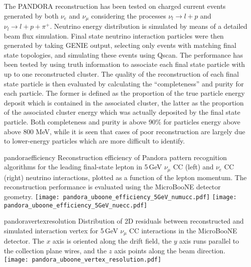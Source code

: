 The PANDORA reconstruction has been tested on charged current events generated by both   $\nu_{e}$  and $\nu_{\mu}$  
considering the processes $\nu_{l}\to l+p$  and $\nu_{l}\to l+p+\pi^{+}$.
Neutrino energy distribution is simulated by means of a detailed beam flux simulation.
Final state neutrino interaction particles were then generated by taking GENIE output, selecting only events with matching final state topologies, 
and simulating these events using Qscan.
 The performance has been tested by using truth information to associate each final state particle with up to one reconstructed cluster.
The quality of the reconstruction of each final state particle is then evaluated by calculating the ``completeness'' and purity for each particle.
The former is defined as the proportion of the true particle energy deposit which 
is contained in the associated cluster, the latter as  the proportion of the associated cluster energy which was actually deposited by the final state particle.
Both completeness and purity is above 90$\%$ for particles energy above above 800 MeV, while
it is seen that cases of poor reconstruction are largely due to lower-energy particles which are more difficult to identify.



\begin{cdrfigure}{pandoraefficiency}
{Reconstruction efficiency of Pandora pattern recognition algorithms
 for the leading final-state lepton in 5\,GeV $\nu_{\mu}$ CC (left) and
 $\nu_{e}$ CC (right) neutrino interactions, plotted as a function of
 the lepton momentum. The reconstruction performance is evaluated
 using the MicroBooNE detector geometry. }
\texttt{[image: pandora\_uboone\_efficiency\_5GeV\_numucc.pdf]}
\texttt{[image: pandora\_uboone\_efficiency\_5GeV\_nuecc.pdf]}
\end{cdrfigure}

\begin{cdrfigure}{pandoravertexresolution}
{Distribution of 2D residuals between reconstructed and simulated interaction
 vertex for 5\,GeV $\nu_{\mu}$ CC interactions in the MicroBooNE detector.
 The $x$ axis is oriented along the drift field, the $y$ axis runs parallel 
 to the collection plane wires, and the $z$ axis points along the beam direction.}
\texttt{[image: pandora\_uboone\_vertex\_resolution.pdf]}
\end{cdrfigure}



